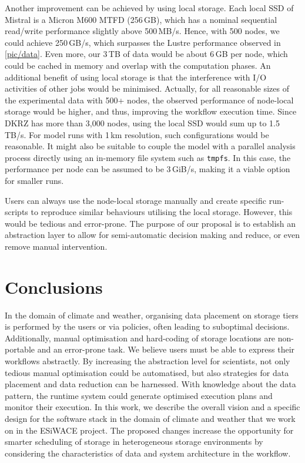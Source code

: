 \documentclass{superfri}
\begin{document}
Another improvement can be achieved by using local storage.
Each local SSD of Mistral is a Micron M600 MTFD (256\,GB), which has a nominal sequential read/write performance slightly above 500\,MB/s.
Hence, with 500 nodes, we could achieve 250\,GB/s, which surpasses the Lustre performance observed in \cref{pic/data}.
Even more, our 3\,TB of data would be about 6\,GB per node, which could be cached in memory and overlap with the computation phases.
An additional benefit of using local storage is that the interference with I/O activities of other jobs would be minimised.
Actually, for all reasonable sizes of the experimental data with 500+ nodes, the observed performance of node-local storage would be higher, and thus, improving the workflow execution time.
Since DKRZ has more than 3,000 nodes, using the local SSD would sum up to 1.5\,TB/s.
For model runs with 1\,km resolution, such configurations would be reasonable.
It might also be suitable to couple the model with a parallel analysis process directly using an in-memory file system such as \texttt{tmpfs}.
In this case, the performance per node can be assumed to be 3\,GiB/s, making it a viable option for smaller runs.

Users can always use the node-local storage manually and create specific run-scripts to reproduce similar behaviours utilising the local storage.
However, this would be tedious and error-prone.
The purpose of our proposal is to establish an abstraction layer to allow for semi-automatic decision making and reduce, or even remove manual intervention.

\section*{Conclusions}
\label{sec:conclusions}

In the domain of climate and weather, organising data placement on storage tiers is performed by the users or via policies, often leading to suboptimal decisions.
Additionally, manual optimisation and hard-coding of storage locations are non-portable and an error-prone task.
We believe users must be able to express their workflows abstractly.
By increasing the abstraction level for scientists, not only tedious manual optimisation could be automatised, but also strategies for data placement and data reduction can be harnessed.
With knowledge about the data pattern, the runtime system could generate optimised execution plans and monitor their execution.
In this work, we describe the overall vision and a specific design for the software stack in the domain of climate and weather that we work on in the ESiWACE project.
The proposed changes increase the opportunity for smarter scheduling of storage in heterogeneous storage environments by considering the characteristics of data and system architecture in the workflow.
\end{document}

